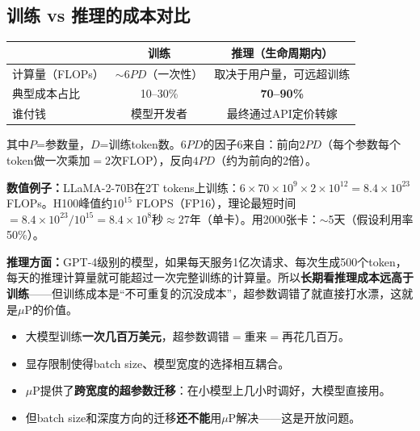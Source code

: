 \documentclass[11pt,a4paper]{article}
\begin{document}
\subsection*{训练 vs 推理的成本对比}

\begin{center}
\renewcommand{\arraystretch}{1.3}
\begin{tabular}{lcc}
\toprule
& 训练 & 推理（生命周期内） \\
\midrule
计算量（FLOPs） & $\sim 6PD$（一次性） & 取决于用户量，可远超训练 \\
典型成本占比 & 10--30\% & \textbf{70--90\%} \\
谁付钱 & 模型开发者 & 最终通过API定价转嫁 \\
\bottomrule
\end{tabular}
\end{center}

其中$P$=参数量，$D$=训练token数。$6PD$的因子6来自：前向$2PD$（每个参数每个token做一次乘加$=2$次FLOP），反向$4PD$（约为前向的2倍）。

\textbf{数值例子：}LLaMA-2-70B在2T tokens上训练：$6\times 70\times 10^9\times 2\times 10^{12} = 8.4\times 10^{23}$ FLOPs。H100峰值约$10^{15}$ FLOPS（FP16），理论最短时间$=8.4\times 10^{23}/10^{15}=8.4\times 10^8$秒$\approx 27$年（单卡）。用2000张卡：$\sim$5天（假设利用率50\%）。

\textbf{推理方面：}GPT-4级别的模型，如果每天服务1亿次请求、每次生成500个token，每天的推理计算量就可能超过一次完整训练的计算量。所以\textbf{长期看推理成本远高于训练}——但训练成本是``不可重复的沉没成本''，超参数调错了就直接打水漂，这就是$\mu$P的价值。

\begin{tcolorbox}[colback=yellow!10,colframe=yellow!60!black,title=\textbf{小结：为什么本周内容重要}]
\begin{itemize}[leftmargin=*]
\item 大模型训练\textbf{一次几百万美元}，超参数调错$=$重来$=$再花几百万。
\item 显存限制使得batch size、模型宽度的选择相互耦合。
\item $\mu$P提供了\textbf{跨宽度的超参数迁移}：在小模型上几小时调好，大模型直接用。
\item 但batch size和深度方向的迁移\textbf{还不能}用$\mu$P解决——这是开放问题。
\end{itemize}
\end{tcolorbox}

\newpage

\end{document}
